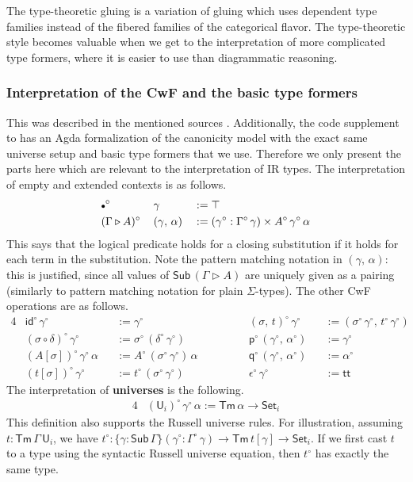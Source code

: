 \documentclass[acmsmall,screen,review,anonymous]{acmart}
\newcommand{\msf}[1]{{\mathsf{#1}}}
\newcommand{\p}{\mathsf{p}}
\newcommand{\q}{\mathsf{q}}
\newcommand{\U}{\msf{U}}
\newcommand{\Set}{\msf{Set}}
\newcommand{\ttt}{\msf{tt}}
\newcommand{\emptycon}{\scaleobj{.75}\bullet}
\newcommand{\id}{\msf{id}}
\newcommand{\Sub}{\msf{Sub}}
\newcommand{\Tm}{\msf{Tm}}
\newcommand{\ext}{\triangleright}
\newcommand{\w}{\circ}
\begin{document}
The type-theoretic gluing is a variation of gluing which uses dependent type families
instead of the fibered families of the categorical flavor. The type-theoretic style becomes valuable
when we get to the interpretation of more complicated type formers, where it is easier to use than
diagrammatic reasoning.

\subsubsection{Interpretation of the CwF and the basic type formers}

This was described in the mentioned sources \cite{gluing,coquand2018canonicity}. Additionally,
the code supplement \cite{formalisation} to \cite{DBLP:conf/mpc/KaposiKK19} has an Agda
formalization of the canonicity model with the exact same universe setup and basic type formers that
we use. Therefore we only present the parts here which are relevant to the interpretation of IR
types. The interpretation of empty and extended contexts is as follows.
\begin{alignat*}{3}
  &\emptycon^\w\,&&\gamma                 &&:= \top \\
  &(\Gamma\ext A)^\w\,&&(\gamma,\,\alpha) &&:= (\gamma^\w : \Gamma^\w\,\gamma) \times A^\w\,\gamma^\w\,\alpha
\end{alignat*}
This says that the logical predicate holds for a closing substitution if it holds for each term in
the substitution. Note the pattern matching notation in $(\gamma,\,\alpha)$: this is justified,
since all values of $\Sub\,(\Gamma\ext A)$ are uniquely given as a pairing (similarly to pattern
matching notation for plain $\Sigma$-types). The other CwF operations are as follows.
\begin{alignat*}{4}
  &\id^\w\,\gamma^\w                   &&:= \gamma^\w                  &&(\sigma,\,t)^\w\,\gamma^\w          &&:= (\sigma^\w\,\gamma^\w,\,t^\w\,\gamma^\w)\\
  &(\sigma \circ \delta)^\w\,\gamma^\w &&:= \sigma^\w\,(\delta^\w\,\gamma^\w) && \p^\w\,(\gamma^\w,\,\alpha^\w)      &&:= \gamma^\w\\
  &(A[\sigma]) ^\w\,\gamma^\w\,\alpha  &&:= A^\w\,(\sigma^\w\,\gamma^\w)\,\alpha\hspace{3em} && \q^\w\,(\gamma^\w,\,\alpha^\w)      &&:= \alpha^\w\\
  &(t[\sigma]) ^\w\,\gamma^\w          &&:= t^\w\,(\sigma^\w\,\gamma^\w) && \epsilon^\w\,\gamma^\w              &&:= \ttt
\end{alignat*}
The interpretation of \textbf{universes} is the following.
\begin{alignat*}{4}
  &(\U_i)^\w\,\gamma^\w\,\alpha := \Tm\,\alpha \to \Set_i
\end{alignat*}
This definition also supports the Russell universe rules. For illustration, assuming $t :
\Tm\,\Gamma\,\U_i$, we have $t^\w : \{\gamma : \Sub\,\Gamma\}(\gamma^\w : \Gamma^\w\,\gamma) \to
\Tm\,t[\gamma] \to \Set_i$. If we first cast $t$ to a type using the syntactic Russell
universe equation, then $t^\w$ has exactly the same type.
\end{document}
